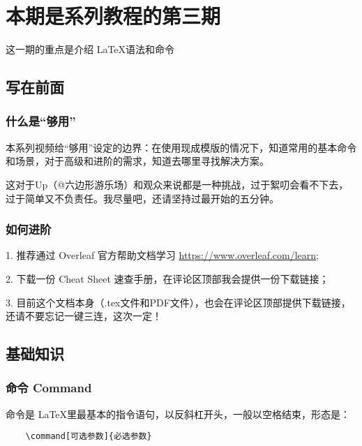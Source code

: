 
\chapter{本期是系列教程的第三期}

这一期的重点是介绍 \LaTeX 语法和命令

\section{写在前面}
\subsection{什么是“够用”}
本系列视频给“够用”设定的边界：在使用现成模版的情况下，知道常用的基本命令和场景，对于高级和进阶的需求，知道去哪里寻找解决方案。

这对于Up（@六边形游乐场）和观众来说都是一种挑战，过于絮叨会看不下去，过于简单又不负责任。我尽量吧，还请坚持过最开始的五分钟。

\subsection{如何进阶}
1. 推荐通过 Overleaf 官方帮助文档学习 \url{https://www.overleaf.com/learn}; 

2. 下载一份 Cheat Sheet 速查手册，在评论区顶部我会提供一份下载链接；

3. 目前这个文档本身（.tex文件和PDF文件），也会在评论区顶部提供下载链接，还请不要忘记一键三连，这次一定！

\section{基础知识}


\subsection{命令 Command}

命令是 \LaTeX 里最基本的指令语句，以反斜杠开头，一般以空格结束，形态是：

\begin{verbatim}
    \command[可选参数]{必选参数}
\end{verbatim}

